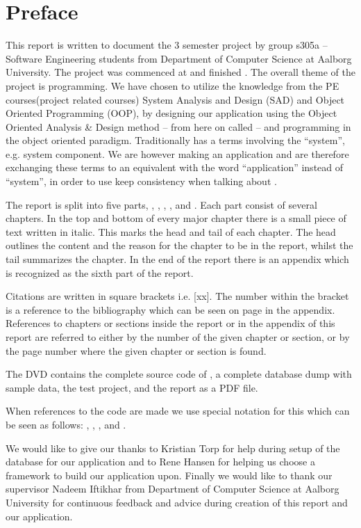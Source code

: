 \chapter*{Preface}
\label{chap:preface}
%
\emptyTop{}%
\vspace{-15mm}%
This report is written to document the 3\rd{} semester project by group s305a -- Software Engineering students from Department of Computer Science at Aalborg University. 
The project was commenced at  and finished .
The overall theme of the project is programming. 
We have chosen to utilize the knowledge from the PE courses(project related courses) System Analysis and Design (SAD) and Object Oriented Programming (OOP), by designing our application using the Object Oriented Analysis \& Design method -- from here on called \ooad[] -- and programming \hdesk[] in the object oriented paradigm.  
Traditionally \ooad[] has a terms involving the ``system'', e.g. system component.
We are however making an application and are therefore exchanging these terms to an equivalent with the word ``application'' instead of ``system'', in order to use keep consistency when talking about \hdesk[].

The report is split into five parts, , , , , and .
Each part consist of several chapters.
In the top and bottom of every major chapter there is a small piece of text written in italic.
This marks the head and tail of each chapter.
The head outlines the content and the reason for the chapter to be in the report, whilst the tail summarizes the chapter.
In the end of the report there is an appendix which is recognized as the sixth part of the report.

Citations are written in square brackets i.e. [xx]. The number within the bracket is a reference to the bibliography which can be seen on page \pageref{chap:bib} in the appendix.
References to chapters or sections inside the report or in the appendix of this report are referred to either by the number of the given chapter or section, or by the page number where the given chapter or section is found.

The DVD contains the complete source code of \hdesk[], a complete database dump with sample data, the test project, and the report as a PDF file.  

When references to the code are made we use special notation for this which can be seen as follows: , , , and .

We would like to give our thanks to Kristian Torp for help during setup of the database for our application and to Rene Hansen for helping us choose a framework to build our application upon.
Finally we would like to thank our supervisor Nadeem Iftikhar from Department of Computer Science at Aalborg University for continuous feedback and advice during creation of this report and our application.